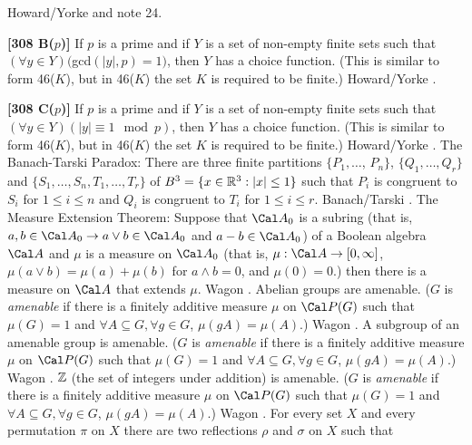 \ac{Howard/Yorke} \cite{1987} and note 24.
\smallskip
\item{}{\bf [308 B($p$)]} If $p$ is a prime and if $Y$ is a set of
non-empty finite sets such that $(\forall y\in Y)($gcd$(|y|,p)=1)$, then
$Y$ has a choice function.  (This is similar to form 46($K$), but in
46($K$) the set $K$ is required to be finite.) \ac{Howard/Yorke}
\cite{1987}.
\smallskip
\item{}{\bf [308 C($p$)]} If $p$ is a prime and if $Y$ is a set of
non-empty finite sets such that $(\forall y\in Y)(|y|\equiv 1\mod p)$,
then $Y$ has a choice function. (This is similar to form 46($K$), but
in 46($K$) the set $K$ is required to be finite.) \ac{Howard/Yorke}
\cite{1987}.
\medskip
{} The Banach-Tarski Paradox: There are three finite
partitions $\{P_1,\ldots$, $P_n\}$, $\{Q_1,\ldots,Q_r\}$ and
$\{S_1,\ldots,S_n, T_1,\ldots,T_r\}$ of $B^3 = \{x\in {\Bbb R}^3 : |x|
\le 1\}$ such that $P_i$ is congruent to $S_i$ for $1\le i\le n$ and
$Q_i$ is congruent to $T_i$ for $1\le i\le r$.  \ac{Banach/Tarski}
\cite{1924}.
\medskip
{} The Measure Extension Theorem: Suppose that $\Cal
A_0$ is a subring (that is, $a,b \in \Cal A_0  \to a\vee b \in \Cal A_0$
and $a-b \in \Cal A_0$) of a Boolean algebra $\Cal A$ and $\mu$ is a
measure on $\Cal A_0$ (that is, $\mu:\Cal A \to [0,\infty]$, $\mu(a\vee b)
=\mu(a)+\mu(b)$ for $a\land b = 0$, and $\mu(0) = 0$.) then there is a
measure on $\Cal A$ that extends $\mu$.  \ac{Wagon} \cite{1985}.
\medskip
{} Abelian groups are amenable. ($G$ is {\it
amenable} if there is a finitely additive measure $\mu$ on $\Cal P(G)$
such that $\mu(G)=1$ and $\forall A\subseteq G, \forall g\in G$,
$\mu(gA)=\mu(A)$.) \ac{Wagon} \cite{1985}.
\medskip
{} A subgroup of an amenable group is amenable.
($G$ is {\it amenable} if there is a finitely additive measure $\mu$ on
$\Cal P(G)$ such that $\mu(G) = 1$ and $\forall A\subseteq G, \forall g
\in G$, $\mu(gA)=\mu(A)$.)  \ac{Wagon} \cite{1985}.
\medskip
{} $\Bbb Z$ (the set of integers under addition) is
amenable.  ($G$ is {\it amenable} if there is a finitely additive
measure $\mu$ on $\Cal P(G)$ such that $\mu(G) = 1$ and $\forall
A\subseteq G, \forall g\in G$, $\mu(gA)=\mu(A)$.)  \ac{Wagon} \cite{1985}.
\medskip
{} For every set $X$ and every permutation $\pi$
on $X$ there are two reflections $\rho$ and $\sigma$ on $X$ such that
